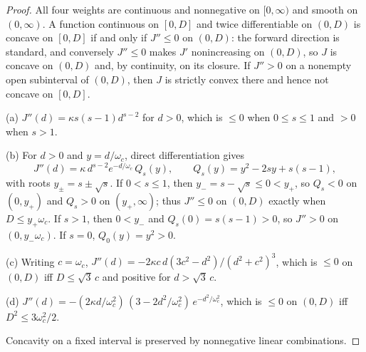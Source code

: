 \documentclass[11pt,a4paper]{article}
\theoremstyle{remark}\newtheorem{remark}[theorem]{Remark}
\begin{document}
\begin{proof}
All four weights are continuous and nonnegative on $[0,\infty)$ and smooth on $(0,\infty)$. A function continuous on $[0,D]$ and twice differentiable on $(0,D)$ is concave on $[0,D]$ if and only if $J''\le0$ on $(0,D)$: the forward direction is standard, and conversely $J''\le0$ makes $J'$ nonincreasing on $(0,D)$, so $J$ is concave on $(0,D)$ and, by continuity, on its closure. If $J''>0$ on a nonempty open subinterval of $(0,D)$, then $J$ is strictly convex there and hence not concave on $[0,D]$.

(a) $J''(d)=\kappa s(s-1)d^{s-2}$ for $d>0$, which is $\le0$ when $0\le s\le1$ and $>0$ when $s>1$.

(b) For $d>0$ and $y=d/\omega_c$, direct differentiation gives
\begin{equation}
 J''(d)=\kappa\,d^{s-2}e^{-d/\omega_c}\,Q_s(y),\qquad Q_s(y)=y^2-2sy+s(s-1),
 \label{eq:Qs}
\end{equation}
with roots $y_\pm=s\pm\sqrt s$. If $0<s\le1$, then $y_-=s-\sqrt s\le0<y_+$, so $Q_s<0$ on $(0,y_+)$ and $Q_s>0$ on $(y_+,\infty)$; thus $J''\le0$ on $(0,D)$ exactly when $D\le y_+\omega_c$. If $s>1$, then $0<y_-$ and $Q_s(0)=s(s-1)>0$, so $J''>0$ on $(0,y_-\omega_c)$. If $s=0$, $Q_0(y)=y^2>0$.

(c) Writing $c=\omega_c$, $J''(d)=-2\kappa c\,d(3c^2-d^2)/(d^2+c^2)^3$, which is $\le0$ on $(0,D)$ iff $D\le\sqrt3\,c$ and positive for $d>\sqrt3\,c$.

(d) $J''(d)=-(2\kappa d/\omega_c^2)\,(3-2d^2/\omega_c^2)\,e^{-d^2/\omega_c^2}$, which is $\le0$ on $(0,D)$ iff $D^2\le3\omega_c^2/2$.

Concavity on a fixed interval is preserved by nonnegative linear combinations.
\end{proof}
\end{document}
